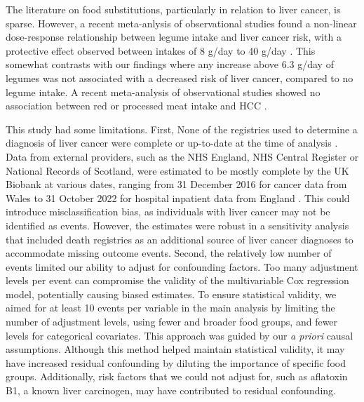 \documentclass[sn-basic,Numbered,iicol,pdflatex]{sn-jnl}
\begin{document}
The literature on food substitutions, particularly in relation to liver
cancer, is sparse. However, a recent meta-anlysis of observational
studies found a non-linear dose-response relationship between legume
intake and liver cancer risk, with a protective effect observed between
intakes of 8 g/day to 40 g/day \citep{liu2023a}. This somewhat contrasts with
our findings where any increase above 6.3 g/day of legumes was not
associated with a decreased risk of liver cancer, compared to no legume
intake. A recent meta-analysis of observational studies showed no
association between red or processed meat intake and HCC \citep{Di2023}.

This study had some limitations. First, None of the registries used to
determine a diagnosis of liver cancer were complete or up-to-date at the
time of analysis \citep{RN112}. Data from external providers, such as the NHS
England, NHS Central Register or National Records of Scotland, were
estimated to be mostly complete by the UK Biobank at various dates,
ranging from 31 December 2016 for cancer data from Wales to 31 October
2022 for hospital inpatient data from England \citep{RN114}. This could
introduce misclassification bias, as individuals with liver cancer may
not be identified as events. However, the estimates were robust in a
sensitivity analysis that included death registries as an additional
source of liver cancer diagnoses to accommodate missing outcome events.
Second, the relatively low number of events limited our ability to
adjust for confounding factors. Too many adjustment levels per event can
compromise the validity of the multivariable Cox regression model,
potentially causing biased estimates. To ensure statistical validity, we
aimed for at least 10 events per variable in the main analysis by
limiting the number of adjustment levels, using fewer and broader food
groups, and fewer levels for categorical covariates. This approach was
guided by our \emph{a priori} causal assumptions. Although this method helped
maintain statistical validity, it may have increased residual
confounding by diluting the importance of specific food groups.
Additionally, risk factors that we could not adjust for, such as
aflatoxin B1, a known liver carcinogen, may have contributed to residual
confounding.
\end{document}
